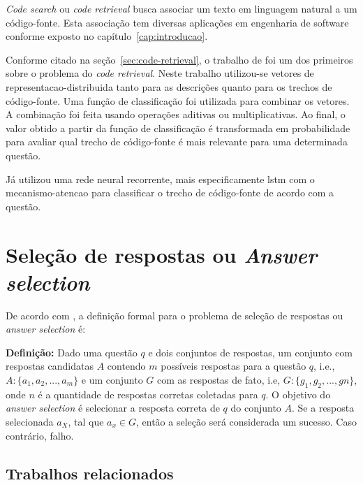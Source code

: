 \textit{Code search} ou \textit{code retrieval} busca associar um texto em linguagem natural a um código-fonte. Esta associação tem diversas aplicações em engenharia de software conforme exposto no capítulo~\ref{cap:introducao}.

Conforme citado na seção~\ref{sec:code-retrieval}, o trabalho de \cite{Allamanis-bimodal-source-code-natural-language:2015} foi um dos primeiros sobre o problema do \textit{code retrieval}. Neste trabalho utilizou-se vetores de \gls{representacao-distribuida} tanto para as descrições quanto para os trechos de código-fonte. Uma função de classificação foi utilizada para combinar os vetores. A combinação foi feita usando operações aditivas ou multiplicativas. Ao final, o valor obtido a partir da função de classificação é transformada em probabilidade para avaliar qual trecho de código-fonte é mais relevante para uma determinada questão.

Já \cite{iyer-etal-2016-summarizing} utilizou uma rede neural recorrente, mais especificamente \acrshort{lstm} com o \gls{mecanismo-atencao} para classificar o trecho de código-fonte de acordo com a questão.



\section{Seleção de respostas ou \textit{Answer selection}}
\label{sec:answer-selection}

De acordo com \cite{shao-answer-selection:2019}, a definição formal para o problema de seleção de respostas ou \textit{answer selection} é:

\textbf{Definição:} Dado uma questão $q$ e dois conjuntos de respostas, um conjunto com respostas candidatas $A$ contendo $m$ possíveis respostas para a questão $q$, i.e., $A : \{ a_{1}, a_{2}, . . ., a_{m}\}$ e um conjunto $G$ com as respostas de fato, i.e, $G : \{ g_{1}, g_{2}, . . ., g{n}\}$, onde $n$ é a quantidade de respostas corretas coletadas para $q$. O objetivo do \textit{answer selection} é selecionar a resposta correta de $q$ do conjunto $A$. Se a resposta selecionada $a_{X}$, tal que $a_{x} \in G$, então a seleção será considerada um sucesso. Caso contrário, falho.

\subsection{Trabalhos relacionados}\label{sec:answer-selection-trabalhos-relacionados}

